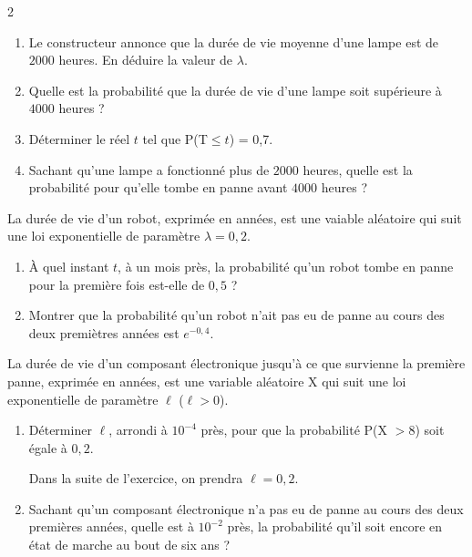 \begin{multicols}{2}
\begin{exercice_cours}[\quad]{}
\begin{enumerate}
	\item Le constructeur annonce que la durée de vie moyenne d'une lampe est de $2000$ heures. En déduire la valeur de $\lambda$.
	\item Quelle est la probabilité que la durée de vie d'une lampe soit supérieure à $4000$ heures ?
	\item Déterminer le réel $t$ tel que P(T$\leq t$) = 0,7.
	\item Sachant qu'une lampe a fonctionné plus de $2000$ heures, quelle est la probabilité pour qu'elle tombe en panne avant $4000$ heures ?
\end{enumerate}


\end{exercice_cours}
\begin{exercice_cours}[\quad]{}
La durée de vie d'un robot, exprimée en années, est une vaiable aléatoire qui suit une loi exponentielle de paramètre $\lambda=0,2$.

\begin{enumerate}
	\item À quel instant $t$, à un mois près, la probabilité qu'un robot tombe en panne pour la première fois est-elle de $0,5$ ?
	\item Montrer que la probabilité qu'un robot n'ait pas eu de panne au cours des deux premiètres années est $e^{-0,4}$.
\end{enumerate}

\end{exercice_cours}
\begin{exercice_cours}[\quad]{}
La durée de vie d'un composant électronique jusqu'à ce que survienne la première panne, exprimée en années, est une variable aléatoire X qui suit une loi exponentielle de paramètre $\ell$ ($\ell > 0$).

\begin{enumerate}
	\item Déterminer $\ell$, arrondi à $10^{-4}$ près, pour que la probabilité P(X $> 8$) soit égale à $0,2$.
	
	Dans la suite de l'exercice, on prendra $\ell = 0,2$.
	\item Sachant qu'un composant électronique n'a pas eu de panne au cours des deux premières années, quelle est à $10^{-2}$ près, la probabilité qu'il soit encore en état de marche au bout de six ans ?
\end{enumerate}

\end{exercice_cours}
\end{multicols}	